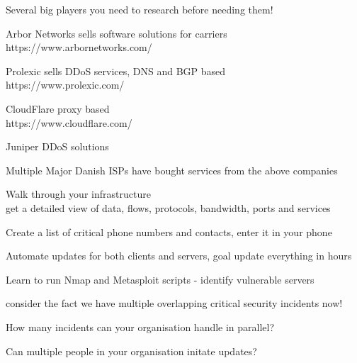 \documentclass[20pt,landscape,a4paper,footrule]{foils}
\begin{document}


\begin{list1}
\item Several big players you need to research before needing them!
\item Arbor Networks sells software solutions for carriers\\
https://www.arbornetworks.com/

\item Prolexic sells DDoS services, DNS and BGP based\\
https://www.prolexic.com/

\item CloudFlare proxy based\\
https://www.cloudflare.com/

\item Juniper DDoS solutions
\end{list1}


\vskip 2cm
\centerline{Multiple Major Danish ISPs have bought services from the above companies}




\begin{list2}
\item Walk through your infrastructure\\
get a detailed view of data, flows, protocols, bandwidth, ports and services

\item Create a list of critical phone numbers and contacts, enter it in your phone
\item Automate updates for both clients and servers, goal update everything in hours
\item Learn to run Nmap and Metasploit scripts - identify vulnerable servers
\end{list2}

\vskip 2cm
\centerline{consider the fact we have multiple overlapping critical security incidents now!}

\vskip 2cm
How many incidents can your organisation handle in parallel?

Can multiple people in your organisation initate updates?
\end{document}
